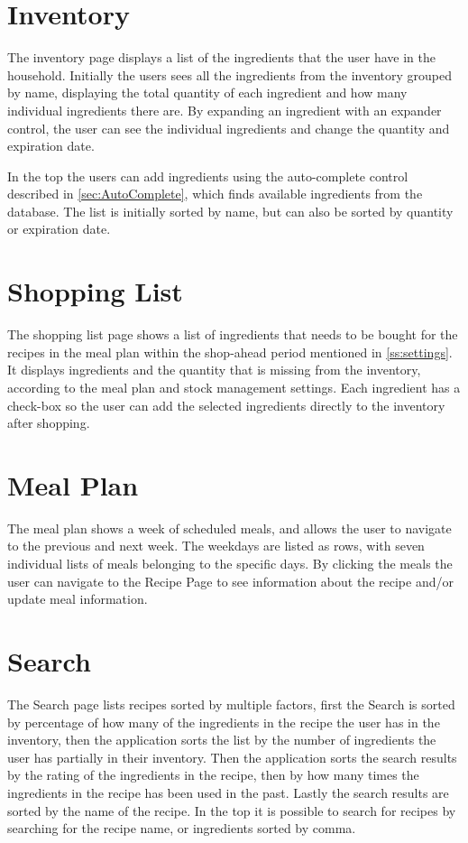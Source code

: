 \section{Inventory} \label{ss:inventory}
The inventory page displays a list of the ingredients that the user have in the household. Initially the users sees all the ingredients from the inventory grouped by name, displaying the total quantity of each ingredient and how many individual ingredients there are. By expanding an ingredient with an expander control, the user can see the individual ingredients and change the quantity and expiration date.

In the top the users can add ingredients using the auto-complete control described in \cref{sec:AutoComplete}, which finds available ingredients from the database. The list is initially sorted by name, but can also be sorted by quantity or expiration date.

\section{Shopping List}
The shopping list page shows a list of ingredients that needs to be bought for the recipes in the meal plan within the shop-ahead period mentioned in \cref{ss:settings}. It displays ingredients and the quantity that is missing from the inventory, according to the meal plan and stock management settings. Each ingredient has a check-box so the user can add the selected ingredients directly to the inventory after shopping.

\section{Meal Plan}
The meal plan shows a week of scheduled meals, and allows the user to navigate to the previous and next week. The weekdays are listed as rows, with seven individual lists of meals belonging to the specific days. By clicking the meals the  user can navigate to the Recipe Page to see information about the recipe and/or update meal information.

\section{Search}
The Search page lists recipes sorted by multiple factors, first the Search is sorted by percentage of how many of the ingredients in the recipe the user has in the inventory, then the application sorts the list by the number of ingredients the user has partially in their inventory. Then the application sorts the search results by the rating of the ingredients in the recipe, then by how many times the ingredients in the recipe has been used in the past. Lastly the search results are sorted by the name of the recipe.
In the top it is possible to search for recipes by searching for the recipe name, or ingredients sorted by comma.

